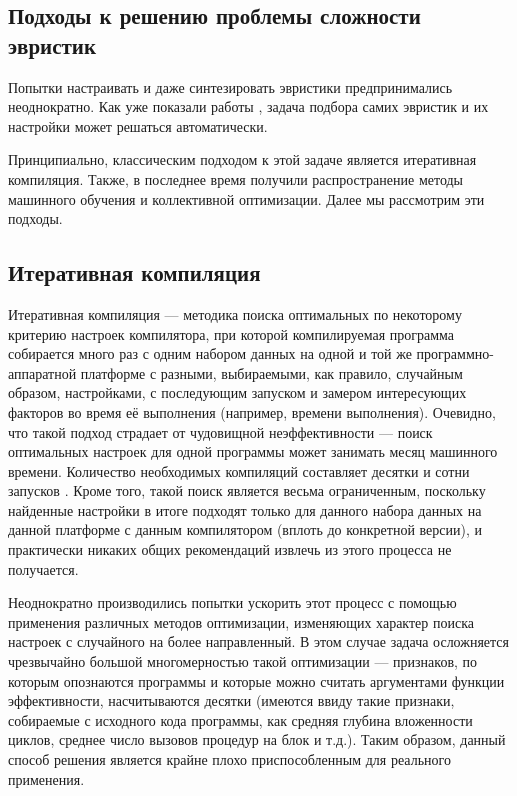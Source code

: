 \subsection{Подходы к решению проблемы сложности эвристик}
Попытки настраивать и даже синтезировать \cite{Stephenson:2006:ACC:1269626,Stephenson:2003:MOI:780822.781141} эвристики предпринимались неоднократно. Как уже показали работы \cite{Agakov:2006:UML:1121992.1122412,Bodin98iterativecompilation,FCA2007,Cooper:2005:AAC:1065910.1065921}, задача подбора самих эвристик и их настройки может решаться автоматически.

Принципиально, классическим подходом к этой задаче является итеративная компиляция. Также, в последнее время получили распространение методы машинного обучения и коллективной оптимизации. Далее мы рассмотрим эти подходы.

\subsection{Итеративная компиляция}
Итеративная компиляция --- методика поиска оптимальных по некоторому критерию настроек компилятора, при которой компилируемая программа собирается много раз с одним набором данных на одной и той же программно-аппаратной платформе с разными, выбираемыми, как правило, случайным образом, настройками, с последующим запуском и замером интересующих факторов во время её выполнения (например, времени выполнения). Очевидно, что такой подход страдает от чудовищной неэффективности --- поиск оптимальных настроек для одной программы может занимать месяц машинного времени. Количество необходимых компиляций составляет десятки и сотни запусков \cite{Kisuki:1999:FSI:646347.690219}. Кроме того, такой поиск является весьма ограниченным, поскольку найденные настройки в итоге подходят только для данного набора данных на данной платформе с данным компилятором (вплоть до конкретной версии), и практически никаких общих рекомендаций извлечь из этого процесса не получается.

Неоднократно производились попытки ускорить этот процесс с помощью применения различных методов оптимизации, изменяющих характер поиска настроек с случайного на более направленный. В этом случае задача осложняется чрезвычайно большой многомерностью такой оптимизации --- признаков, по которым опознаются программы и которые можно считать аргументами функции эффективности, насчитываются десятки (имеются ввиду такие признаки, собираемые с исходного кода программы, как средняя глубина вложенности циклов, среднее число вызовов процедур на блок и т.д.). Таким образом, данный способ решения является крайне плохо приспособленным для реального применения.

